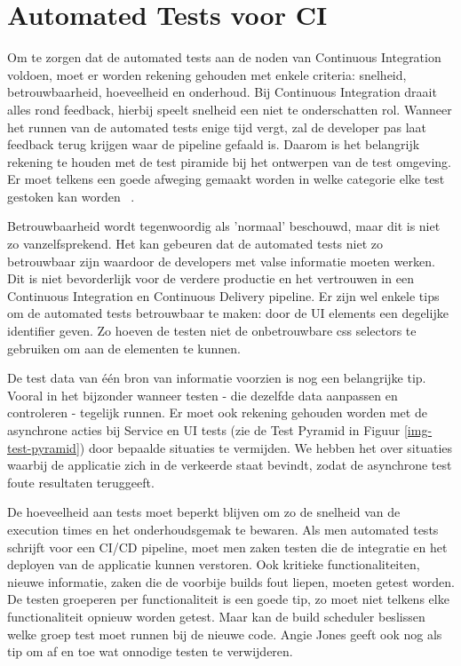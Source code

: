 \section{Automated Tests voor CI}
\label{sec:automated-test-voor-ci}
Om te zorgen dat de automated tests aan de noden van Continuous Integration voldoen, moet er worden rekening gehouden met enkele criteria: snelheid, betrouwbaarheid, hoeveelheid en onderhoud.
Bij Continuous Integration draait alles rond feedback, hierbij speelt snelheid een niet te onderschatten rol. Wanneer het runnen van de automated tests enige tijd vergt, zal de developer pas laat feedback terug krijgen waar de pipeline gefaald is. Daarom is het belangrijk rekening te houden met de test piramide bij het ontwerpen van de test omgeving. Er moet telkens een goede afweging gemaakt worden in welke categorie elke test gestoken kan worden ~\autocite{Jones2019}.

Betrouwbaarheid wordt tegenwoordig als 'normaal' beschouwd, maar dit is niet zo vanzelfsprekend. Het kan gebeuren dat de automated tests niet zo betrouwbaar zijn waardoor de developers met valse informatie moeten werken. Dit is niet bevorderlijk voor de verdere productie en het vertrouwen in een Continuous Integration en Continuous Delivery pipeline. Er zijn wel enkele tips om de automated tests betrouwbaar te maken: door de UI elements een degelijke identifier geven. Zo hoeven de testen niet de onbetrouwbare css selectors te gebruiken om aan de elementen te kunnen. 

De test data van één bron van informatie voorzien is nog een belangrijke tip. Vooral in het bijzonder wanneer testen - die dezelfde data aanpassen en controleren - tegelijk runnen. Er moet ook rekening gehouden worden met de asynchrone acties bij Service en UI tests (zie de Test Pyramid in Figuur \ref{img-test-pyramid}) door bepaalde situaties te vermijden. We hebben het over situaties waarbij de applicatie zich in de verkeerde staat bevindt, zodat de asynchrone test foute resultaten teruggeeft.

De hoeveelheid aan tests moet beperkt blijven om zo de snelheid van de execution times en het onderhoudsgemak te bewaren.
Als men automated tests schrijft voor een CI/CD pipeline, moet men zaken testen die de integratie en het deployen van de applicatie kunnen verstoren.
Ook kritieke functionaliteiten, nieuwe informatie, zaken die de voorbije builds fout liepen, moeten getest worden. 
De testen groeperen per functionaliteit is een goede tip, zo moet niet telkens elke functionaliteit opnieuw worden getest. Maar kan de build scheduler beslissen welke groep test moet runnen bij de nieuwe code. 
Angie Jones \textcite{Jones2019} geeft ook nog als tip om af en toe wat onnodige testen te verwijderen.

